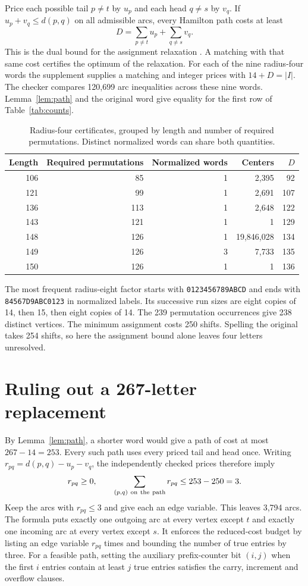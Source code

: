 \documentclass[11pt]{article}
\newcommand{\code}[1]{\texttt{#1}}
\begin{document}
Price each possible tail \(p\ne t\) by \(u_p\) and each head \(q\ne s\) by \(v_q\). If \(u_p+v_q\le d(p,q)\) on all admissible arcs, every Hamilton path costs at least
\[
D=\sum_{p\ne t}u_p+\sum_{q\ne s}v_q.
\]
This is the dual bound for the assignment relaxation \cite{kuhn}. A matching with that same cost certifies the optimum of the relaxation. For each of the nine radius-four words the supplement supplies a matching and integer prices with \(14+D=|I|\). The checker compares 120,699 arc inequalities across these nine words. Lemma~\ref{lem:path} and the original word give equality for the first row of Table~\ref{tab:counts}.

\begin{table}[h]\centering
\caption{Radius-four certificates, grouped by length and number of required permutations. Distinct normalized words can share both quantities.}
\smallskip\small
\begin{tabular}{@{}rrrrr@{}}\toprule
Length & Required permutations & Normalized words & Centers & \(D\)\\\midrule
106 & 85  & 1 & 2,395 & 92\\
121 & 99  & 1 & 2,691 & 107\\
136 & 113 & 1 & 2,648 & 122\\
143 & 121 & 1 & 1 & 129\\
148 & 126 & 1 & 19,846,028 & 134\\
149 & 126 & 3 & 7,733 & 135\\
150 & 126 & 1 & 1 & 136\\\bottomrule
\end{tabular}
\end{table}

The most frequent radius-eight factor starts with \code{0123456789ABCD} and ends with \code{84567D9ABC0123} in normalized labels. Its successive run sizes are eight copies of 14, then 15, then eight copies of 14. The 239 permutation occurrences give 238 distinct vertices. The minimum assignment costs 250 shifts. Spelling the original takes 254 shifts, so here the assignment bound alone leaves four letters unresolved.

\clearpage
\section{Ruling out a 267-letter replacement}\label{sec:refute}
By Lemma~\ref{lem:path}, a shorter word would give a path of cost at most \(267-14=253\). Every such path uses every priced tail and head once. Writing \(r_{pq}=d(p,q)-u_p-v_q\), the independently checked prices therefore imply
\[
r_{pq}\ge0,\qquad \sum_{(p,q)\ {\rm on\ the\ path}}r_{pq}\le253-250=3 .
\]
Keep the arcs with \(r_{pq}\le3\) and give each an edge variable. This leaves 3,794 arcs. The formula puts exactly one outgoing arc at every vertex except \(t\) and exactly one incoming arc at every vertex except \(s\). It enforces the reduced-cost budget by listing an edge variable \(r_{pq}\) times and bounding the number of true entries by three. For a feasible path, setting the auxiliary prefix-counter bit \((i,j)\) when the first \(i\) entries contain at least \(j\) true entries satisfies the carry, increment and overflow clauses.
\end{document}
